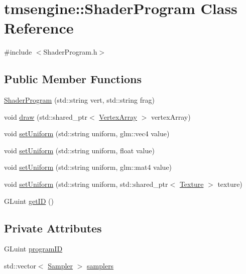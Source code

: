 \hypertarget{classtmsengine_1_1_shader_program}{}\section{tmsengine\+:\+:Shader\+Program Class Reference}
\label{classtmsengine_1_1_shader_program}


{\ttfamily \#include $<$Shader\+Program.\+h$>$}

\subsection*{Public Member Functions}
\begin{DoxyCompactItemize}
\item 
\hyperlink{classtmsengine_1_1_shader_program_abb515227032a61eef897c233ca5112d7}{Shader\+Program} (std\+::string vert, std\+::string frag)
\item 
void \hyperlink{classtmsengine_1_1_shader_program_a3508cadd306f94e631c68482e823bcc0}{draw} (std\+::shared\+\_\+ptr$<$ \hyperlink{classtmsengine_1_1_vertex_array}{Vertex\+Array} $>$ vertex\+Array)
\item 
void \hyperlink{classtmsengine_1_1_shader_program_a0c21d10770fc6753a33ebc2523b2a11d}{set\+Uniform} (std\+::string uniform, glm\+::vec4 value)
\item 
void \hyperlink{classtmsengine_1_1_shader_program_a18107f338613062ed17b0fd029437a81}{set\+Uniform} (std\+::string uniform, float value)
\item 
void \hyperlink{classtmsengine_1_1_shader_program_a5adad298f4eb24e342c0fa5b79dd90a6}{set\+Uniform} (std\+::string uniform, glm\+::mat4 value)
\item 
void \hyperlink{classtmsengine_1_1_shader_program_a048ea3e952f3a2480f20d2b521b56743}{set\+Uniform} (std\+::string uniform, std\+::shared\+\_\+ptr$<$ \hyperlink{classtmsengine_1_1_texture}{Texture} $>$ texture)
\item 
G\+Luint \hyperlink{classtmsengine_1_1_shader_program_a370a695c250cdf490ef8c8573701afed}{get\+ID} ()
\end{DoxyCompactItemize}
\subsection*{Private Attributes}
\begin{DoxyCompactItemize}
\item 
G\+Luint \hyperlink{classtmsengine_1_1_shader_program_a23f13b0cc16d56fd9d1423e06442d67c}{program\+ID}
\item 
std\+::vector$<$ \hyperlink{structtmsengine_1_1_sampler}{Sampler} $>$ \hyperlink{classtmsengine_1_1_shader_program_a3f32e04874a593207c3e2fe5aaef2e5e}{samplers}
\end{DoxyCompactItemize}


